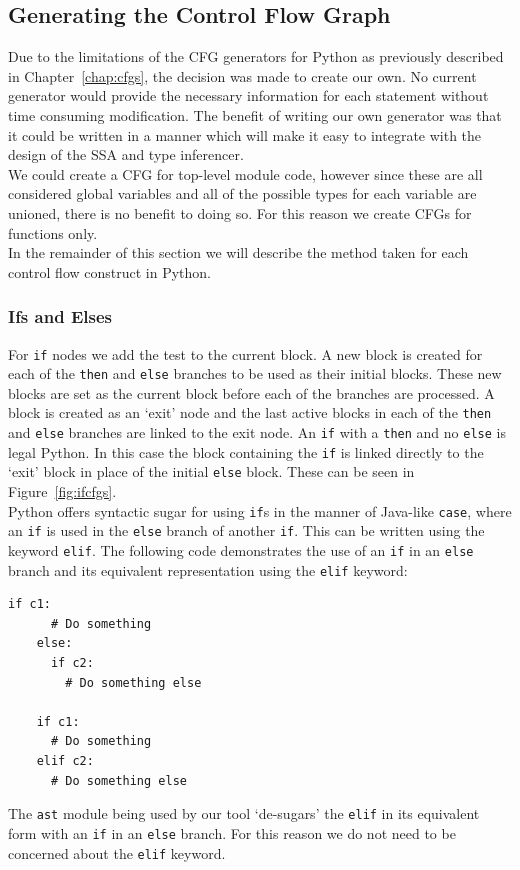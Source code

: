 \documentclass[12pt, titlepage]{article}
\begin{document}
\subsection{Generating the Control Flow Graph}
Due to the limitations of the CFG generators for Python as previously described in Chapter~\ref{chap:cfgs}, the decision was made to create our own. No current generator would provide the necessary information for each statement without time consuming modification. The benefit of writing our own generator was that it could be written in a manner which will make it easy to integrate with the design of the SSA and type inferencer. \\
\indent We could create a CFG for top-level module code, however since these are all considered global variables and all of the possible types for each variable are unioned, there is no benefit to doing so. For this reason we create CFGs for functions only. \\
\indent In the remainder of this section we will describe the method taken for each control flow construct in Python.

\subsubsection{Ifs and Elses}
For \texttt{if} nodes we add the test to the current block. A new block is created for each of the \texttt{then} and \texttt{else} branches to be used as their initial blocks. These new blocks are set as the current block before each of the branches are processed. A block is created as an `exit' node and the last active blocks in each of the \texttt{then} and \texttt{else} branches are linked to the exit node. An \texttt{if} with a \texttt{then} and no \texttt{else} is legal Python. In this case the block containing the \texttt{if} is linked directly to the `exit' block in place of the initial \texttt{else} block. These can be seen in Figure~\ref{fig:ifcfgs}. \\
\indent Python offers syntactic sugar for using \texttt{if}s in the manner of Java-like \texttt{case}, where an \texttt{if} is used in the \texttt{else} branch of another \texttt{if}. This can be written using the keyword \texttt{elif}. The following code demonstrates the use of an \texttt{if} in an \texttt{else} branch and its equivalent representation using the \texttt{elif} keyword:
\begin{lstlisting}[mathescape]
    if c1:
      # Do something
    else:
      if c2:
        # Do something else
	    
    if c1:
      # Do something
    elif c2:
      # Do something else
\end{lstlisting}
The \texttt{ast} module being used by our tool `de-sugars' the \texttt{elif} in its equivalent form with an \texttt{if} in an \texttt{else} branch. For this reason we do not need to be concerned about the \texttt{elif} keyword.
\end{document}

